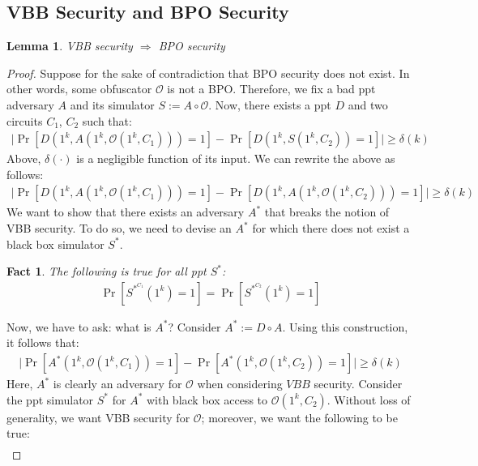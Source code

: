 \documentclass{article}
\newtheorem{lemma}[corollary]{Lemma}
\newtheorem{fact}[corollary]{Fact}
\begin{document}
\subsection{VBB Security and BPO Security}
\begin{lemma}
    VBB security $\Rightarrow$ BPO security
\end{lemma}
\begin{proof}
    Suppose for the sake of contradiction that BPO security does not exist. In other words, some obfuscator $\mathcal{O}$ is not a BPO. Therefore, we fix a bad ppt adversary $A$ and its simulator $S:=A \circ \mathcal{O}$. Now, there exists a ppt $D$ and two circuits $C_1$, $C_2$ such that:
        \begin{align*}
            \biggr\lvert\Pr[D(1^k, A(1^k, \mathcal{O}(1^k, C_1))) = 1] - \Pr[D(1^k, S(1^k, C_2)) = 1] \biggr\rvert \geq \delta(k)
        \end{align*}
    Above, $\delta(\cdot)$ is a negligible function of its input. We can rewrite the above as follows:
        \begin{align*}
            \biggr\lvert\Pr[D(1^k, A(1^k, \mathcal{O}(1^k, C_1))) = 1] - \Pr[D(1^k, A(1^k, \mathcal{O}(1^k, C_2))) = 1] \biggr\rvert \geq \delta(k)
        \end{align*}
    We want to show that there exists an adversary $A^*$ that breaks the notion of VBB security. To do so, we need to devise an $A^*$ for which there does not exist a black box simulator $S^*$.
    \begin{fact} The following is true for all ppt $S^*$:
        \begin{align*}
            \Pr[S^{*^{C_1}}(1^k) = 1] = \Pr[S^{*^{C_2}}(1^k) = 1]
        \end{align*}
    \end{fact}
    \noindent Now, we have to ask: what is $A^*$? Consider $A^* := D \circ A$. Using this construction, it follows that:
        \begin{align*}
            \biggr\lvert\Pr[A^*(1^k, \mathcal{O}(1^k, C_1)) = 1] - \Pr[A^*(1^k, \mathcal{O}(1^k, C_2)) = 1] \biggr\rvert \geq \delta(k)
        \end{align*}
    Here, $A^*$ is clearly an adversary for $\mathcal{O}$ when considering $VBB$ security. Consider the ppt simulator $S^*$ for $A^*$ with black box access to $\mathcal{O}(1^k, C_2)$. Without loss of generality, we want VBB security for $\mathcal{O}$; moreover, we want the following to be true:
        \begin{align*}

\end{align*}
\end{proof}
\end{document}
